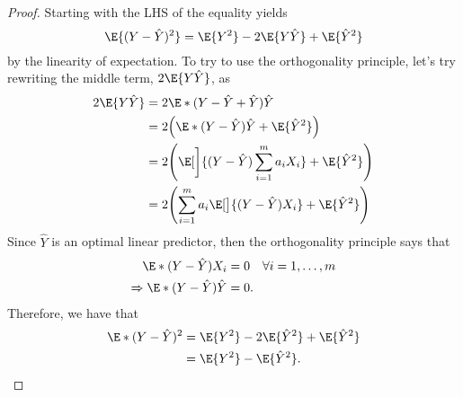 \documentclass[
  coursecode={MTHE 477},
  assignmentname={Homework \homeworknumber},
  studentnumber=20053722,
  name={Bryan Hoang},
  draft,
]{
  ltxanswer%
}
\begin{document}
  \begin{questions}
    \setcounter{question}{\questionnumber}
    \addtocounter{question}{-1}
    \question[20]{}
    \begin{solution}
      \begin{proof}
        Starting with the LHS of the equality yields
        \begin{equation*}
          \E{(Y-\hat{Y})^2} = \E{Y^2} - 2\E{Y\hat{Y}} + \E{\hat{Y}^2}
        \end{equation*}
        by the linearity of expectation. To try to use the orthogonality principle, let's try rewriting the middle term, \(2\E{Y\hat{Y}}\), as
        \begin{align*}
          2\E{Y\hat{Y}} &= 2\E*{(Y - \hat{Y} + \hat{Y})\hat{Y}}                                                \\
                        &= 2\Bigl(\E*{(Y - \hat{Y})\hat{Y}} + \E{\hat{Y}^{2}}\Bigr)                            \\
                        &= 2\Biggl(\E[\bigg]{(Y - \hat{Y})\sum_{i=1}^{m} a_{i} X_{i}} + \E{\hat{Y}^{2}}\Biggr) \\
                        &= 2\Biggl(\sum_{i=1}^{m} a_{i} \E[\big]{(Y - \hat{Y})X_{i}} + \E{\hat{Y}^{2}}\Biggr)
        \end{align*}
        Since \(\hat{Y}\) is an optimal linear predictor, then the orthogonality principle says that
        \begin{align*}
          \E*{(Y - \hat{Y})X_{i}}               &= 0 \quad \forall i = 1, \dotsc, m \\
          \Rightarrow \E*{(Y - \hat{Y})\hat{Y}} &= 0.
        \end{align*}
        Therefore, we have that
        \begin{align*}
          \E*{(Y-\hat{Y})^2} &= \E{Y^2} - 2\E{\hat{Y}^{2}} + \E{\hat{Y}^{2}} \\
                             &= \E{Y^2} - \E{\hat{Y}^{2}}.
        \end{align*}
      \end{proof}
    \end{solution}
  \end{questions}
\end{document}
